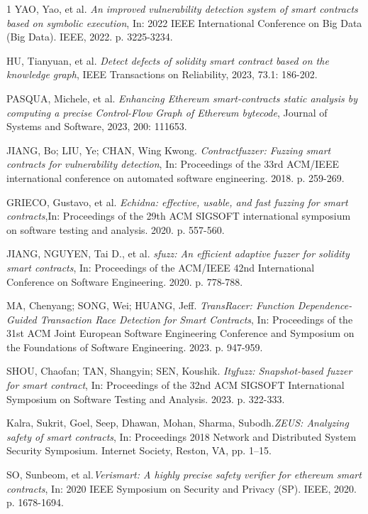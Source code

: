 \documentclass[10pt, conference]{IEEEtran}
\begin{document}
\begin{thebibliography}{1}
     YAO, Yao, et al. \emph{An improved vulnerability detection system of smart contracts based on symbolic execution}, In: 2022 IEEE International Conference on Big Data (Big Data). IEEE, 2022. p. 3225-3234.

    HU, Tianyuan, et al. \emph{Detect defects of solidity smart contract based on the knowledge graph}, IEEE Transactions on Reliability, 2023, 73.1: 186-202.

    PASQUA, Michele, et al. \emph{Enhancing Ethereum smart-contracts static analysis by computing a precise Control-Flow Graph of Ethereum bytecode}, Journal of Systems and Software, 2023, 200: 111653.

    JIANG, Bo; LIU, Ye; CHAN, Wing Kwong. \emph{Contractfuzzer: Fuzzing smart contracts for vulnerability detection}, In: Proceedings of the 33rd ACM/IEEE international conference on automated software engineering. 2018. p. 259-269.

    GRIECO, Gustavo, et al. \emph{Echidna: effective, usable, and fast fuzzing for smart contracts},In: Proceedings of the 29th ACM SIGSOFT international symposium on software testing and analysis. 2020. p. 557-560.

    JIANG, NGUYEN, Tai D., et al. \emph{sfuzz: An efficient adaptive fuzzer for solidity smart contracts},  In: Proceedings of the ACM/IEEE 42nd International Conference on Software Engineering. 2020. p. 778-788.

    MA, Chenyang; SONG, Wei; HUANG, Jeff. \emph{TransRacer: Function Dependence-Guided Transaction Race Detection for Smart Contracts},  In: Proceedings of the 31st ACM Joint European Software Engineering Conference and Symposium on the Foundations of Software Engineering. 2023. p. 947-959.

    SHOU, Chaofan; TAN, Shangyin; SEN, Koushik. \emph{Ityfuzz: Snapshot-based fuzzer for smart contract}, In: Proceedings of the 32nd ACM SIGSOFT International Symposium on Software Testing and Analysis. 2023. p. 322-333.

    Kalra, Sukrit, Goel, Seep, Dhawan, Mohan, Sharma, Subodh.\emph{ZEUS: Analyzing safety of smart contracts}, In: Proceedings 2018 Network and Distributed System Security Symposium. Internet Society, Reston, VA, pp. 1–15.
    
    SO, Sunbeom, et al.\emph{Verismart: A highly precise safety verifier for ethereum smart contracts}, In: 2020 IEEE Symposium on Security and Privacy (SP). IEEE, 2020. p. 1678-1694.


\end{thebibliography}
\end{document}
